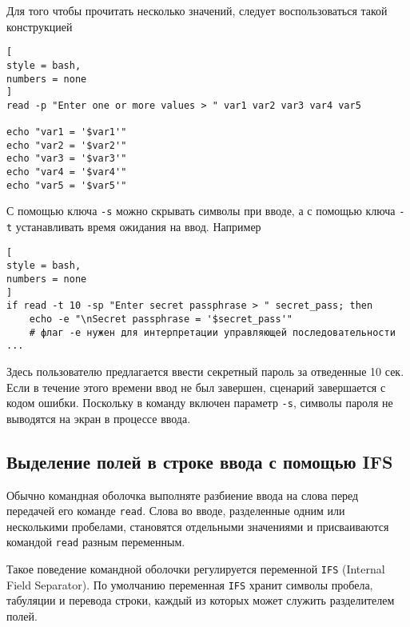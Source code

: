 \documentclass[%
	11pt,
	a4paper,
	utf8,
		]{article}
\begin{document}
Для того чтобы прочитать несколько значений, следует воспользоваться такой конструкцией
\begin{lstlisting}[
style = bash,
numbers = none
]
read -p "Enter one or more values > " var1 var2 var3 var4 var5

echo "var1 = '$var1'"
echo "var2 = '$var2'"
echo "var3 = '$var3'"
echo "var4 = '$var4'"
echo "var5 = '$var5'"
\end{lstlisting}

С помощью ключа \verb|-s| можно скрывать символы при вводе, а с помощью ключа \verb|-t| устанавливать время ожидания на ввод. Например
\begin{lstlisting}[
style = bash,
numbers = none
]
if read -t 10 -sp "Enter secret passphrase > " secret_pass; then
    echo -e "\nSecret passphrase = '$secret_pass'" 
    # флаг -e нужен для интерпретации управляющей последовательности
...
\end{lstlisting}

Здесь пользователю предлагается ввести секретный пароль за отведенные 10 сек. Если в течение этого времени ввод не был завершен, сценарий завершается с кодом ошибки. Поскольку в команду включен параметр \verb|-s|, символы пароля не выводятся на экран в процессе ввода.

\subsection{Выделение полей в строке ввода с помощью IFS}

Обычно командная оболочка выполняте разбиение ввода на слова перед передачей его команде \texttt{read}. Слова во вводе, разделенные одним или несколькими пробелами, становятся отдельными значениями и присваиваются командой \texttt{read} разным переменным.

Такое поведение командной оболочки регулируется переменной \texttt{IFS} (Internal Field Separator). По умолчанию переменная \texttt{IFS} хранит символы пробела, табуляции и перевода строки, каждый из которых может служить разделителем полей.
\end{document}
